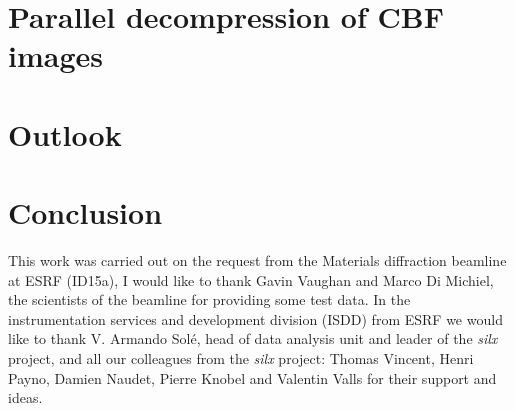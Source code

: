 \documentclass[preprint, pdf]{iucr}              %
\begin{document}
\section{Parallel decompression of CBF images}



\section{Outlook}


\section{Conclusion}

 
This work was carried out on the request from the Materials diffraction beamline 
at ESRF (ID15a), I would like to thank Gavin Vaughan and Marco Di Michiel, the
scientists of the beamline for providing some test data.
In the instrumentation services and development division (ISDD) from ESRF  we
would like to thank V. Armando Solé, head of data analysis unit and leader of 
the \textit{silx} project, and all our colleagues from the \textit{silx}
project:
Thomas Vincent, Henri Payno, Damien Naudet, Pierre Knobel and Valentin Valls for
their support and ideas.



\end{document}
